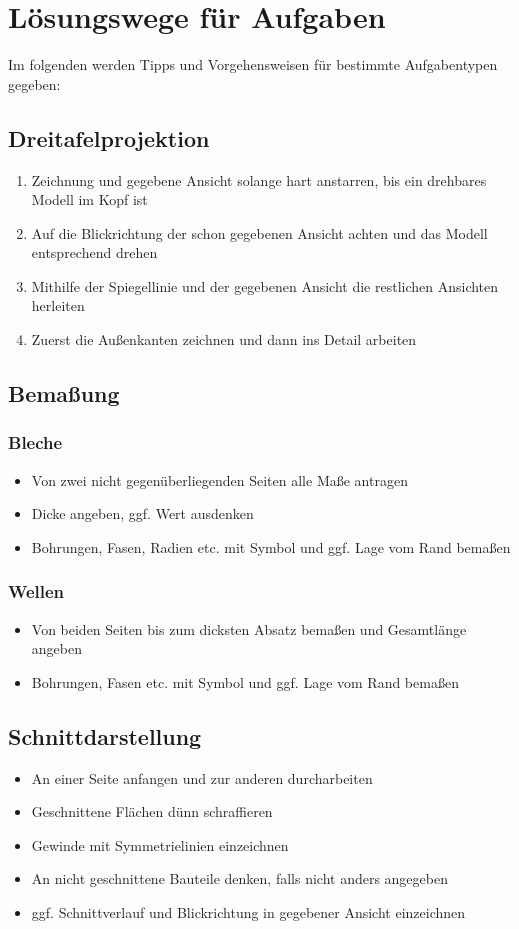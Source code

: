 \documentclass[a4paper,parskip=half*,DIV=7,fontsize=11pt]{scrartcl}
\begin{document}
\pagebreak
\section{Lösungswege für Aufgaben}
Im folgenden werden Tipps und Vorgehensweisen für bestimmte Aufgabentypen gegeben:
\subsection{Dreitafelprojektion}
\begin{enumerate}
	\item Zeichnung und gegebene Ansicht solange hart anstarren, bis ein drehbares Modell im Kopf ist
	\item Auf die Blickrichtung der schon gegebenen Ansicht achten und das Modell entsprechend drehen
	\item Mithilfe der Spiegellinie und der gegebenen Ansicht die restlichen Ansichten herleiten
	\item Zuerst die Außenkanten zeichnen und dann ins Detail arbeiten
\end{enumerate}

\subsection{Bemaßung}
\subsubsection{Bleche}
\begin{itemize}
	\item Von zwei nicht gegenüberliegenden Seiten alle Maße antragen
	\item Dicke angeben, ggf. Wert ausdenken
	\item Bohrungen, Fasen, Radien etc. mit Symbol und ggf. Lage vom Rand bemaßen
\end{itemize}

\subsubsection{Wellen}
\begin{itemize}
	\item Von beiden Seiten bis zum dicksten Absatz bemaßen und Gesamtlänge angeben
	\item Bohrungen, Fasen etc. mit Symbol und ggf. Lage vom Rand bemaßen
\end{itemize}

\subsection{Schnittdarstellung}
\begin{itemize}
	\item An einer Seite anfangen und zur anderen durcharbeiten
	\item Geschnittene Flächen dünn schraffieren
	\item Gewinde mit Symmetrielinien einzeichnen
	\item An nicht geschnittene Bauteile denken, falls nicht anders angegeben
	\item ggf. Schnittverlauf und Blickrichtung in gegebener Ansicht einzeichnen
\end{itemize}
\end{document}
